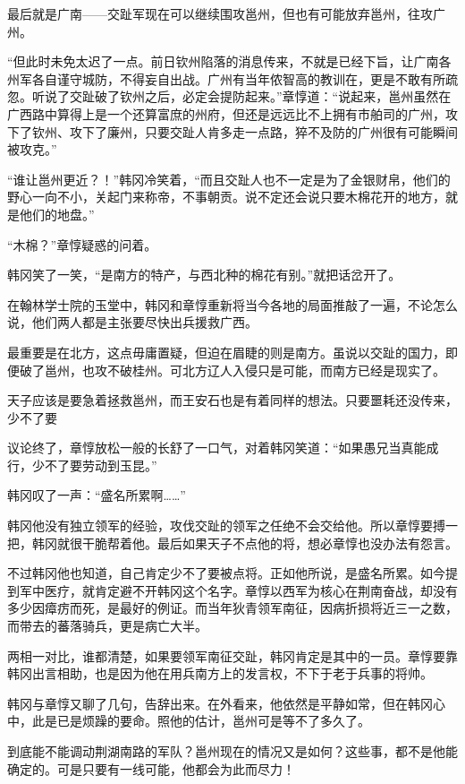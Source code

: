 最后就是广南——交趾军现在可以继续围攻邕州，但也有可能放弃邕州，往攻广州。

“但此时未免太迟了一点。前日钦州陷落的消息传来，不就是已经下旨，让广南各州军各自谨守城防，不得妄自出战。广州有当年侬智高的教训在，更是不敢有所疏忽。听说了交趾破了钦州之后，必定会提防起来。”章惇道：“说起来，邕州虽然在广西路中算得上是一个还算富庶的州府，但还是远远比不上拥有市舶司的广州，攻下了钦州、攻下了廉州，只要交趾人肯多走一点路，猝不及防的广州很有可能瞬间被攻克。”

“谁让邕州更近？！”韩冈冷笑着，“而且交趾人也不一定是为了金银财帛，他们的野心一向不小，关起门来称帝，不事朝贡。说不定还会说只要木棉花开的地方，就是他们的地盘。”

“木棉？”章惇疑惑的问着。

韩冈笑了一笑，“是南方的特产，与西北种的棉花有别。”就把话岔开了。

在翰林学士院的玉堂中，韩冈和章惇重新将当今各地的局面推敲了一遍，不论怎么说，他们两人都是主张要尽快出兵援救广西。

最重要是在北方，这点毋庸置疑，但迫在眉睫的则是南方。虽说以交趾的国力，即便破了邕州，也攻不破桂州。可北方辽人入侵只是可能，而南方已经是现实了。

天子应该是要急着拯救邕州，而王安石也是有着同样的想法。只要噩耗还没传来，少不了要

议论终了，章惇放松一般的长舒了一口气，对着韩冈笑道：“如果愚兄当真能成行，少不了要劳动到玉昆。”

韩冈叹了一声：“盛名所累啊……”

韩冈他没有独立领军的经验，攻伐交趾的领军之任绝不会交给他。所以章惇要搏一把，韩冈就很干脆帮着他。最后如果天子不点他的将，想必章惇也没办法有怨言。

不过韩冈他也知道，自己肯定少不了要被点将。正如他所说，是盛名所累。如今提到军中医疗，就肯定避不开韩冈这个名字。章惇以西军为核心在荆南奋战，却没有多少因瘴疠而死，是最好的例证。而当年狄青领军南征，因病折损将近三一之数，而带去的蕃落骑兵，更是病亡大半。

两相一对比，谁都清楚，如果要领军南征交趾，韩冈肯定是其中的一员。章惇要靠韩冈出言相助，也是因为他在用兵南方上的发言权，不下于老于兵事的将帅。

韩冈与章惇又聊了几句，告辞出来。在外看来，他依然是平静如常，但在韩冈心中，此是已是烦躁的要命。照他的估计，邕州可是等不了多久了。

到底能不能调动荆湖南路的军队？邕州现在的情况又是如何？这些事，都不是他能确定的。可是只要有一线可能，他都会为此而尽力！

